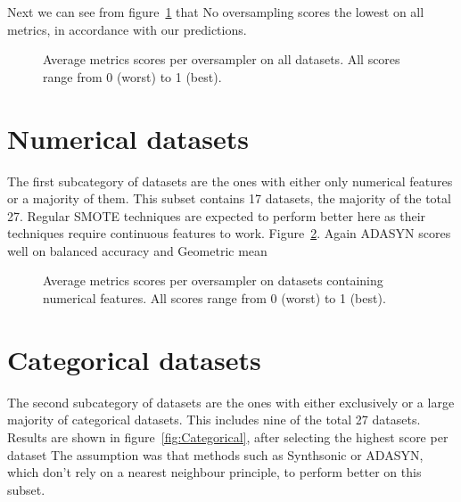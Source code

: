 Next we can see from figure~\ref{fig:Total} that No oversampling scores the lowest on all metrics, in accordance with our predictions. 

\begin{figure}[htp]
\centering
    \quad
    
    \medskip
     \quad
    
    \medskip
    \quad
    
\caption{Average metrics scores per oversampler on all datasets. All scores range from 0 (worst) to 1 (best).}
\label{fig:Total}
\end{figure}

\section{Numerical datasets}
The first subcategory of datasets are the ones with either only numerical features or a majority of them. This subset contains 17 datasets, the majority of the total 27. Regular SMOTE techniques are expected to perform better here as their techniques require continuous features to work. Figure~\ref{fig:Numerical}. Again ADASYN scores well on balanced accuracy and Geometric mean 

\begin{figure}[htp]
\centering
    \quad
    
    \medskip
     \quad
    
    \medskip
    \quad
    
\caption{Average metrics scores per oversampler on datasets containing numerical features. All scores range from 0 (worst) to 1 (best).}
\label{fig:Numerical}
\end{figure}

\section{Categorical datasets}
The second subcategory of datasets are the ones with either exclusively or a large majority of categorical datasets. This includes nine of the total 27 datasets. Results are shown in figure~\ref{fig:Categorical}, after selecting the highest score per dataset  The assumption was that methods such as Synthsonic or ADASYN, which don't rely on a nearest neighbour principle, to perform better on this subset.

